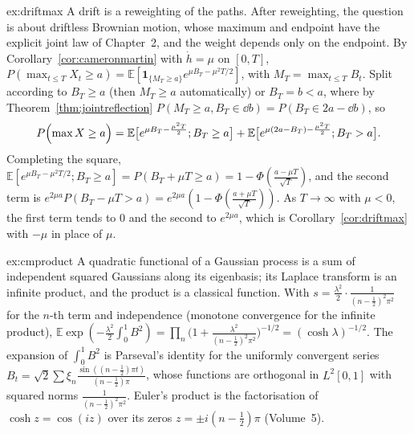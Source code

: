 \begin{solution}{ex:driftmax}
\idea A drift is a reweighting of the paths. After reweighting, the question is about driftless Brownian motion, whose maximum and endpoint have the explicit joint law of Chapter~2, and the weight depends
only on the endpoint.
\writeup By Corollary~\ref{cor:cameronmartin} with $\dot h=\mu$ on $[0,T]$, $P(\max_{t\le T}X_t\ge a)=\mathbb E[\mathbf 1_{\{M_T\ge a\}}e^{\mu B_T-\mu^2T/2}]$, with $M_T=\max_{t\le T}B_t$. Split according to $B_T\ge a$ (then $M_T\ge a$
automatically) or $B_T=b<a$, where by Theorem~\ref{thm:jointreflection} $P(M_T\ge a,B_T\in\dd b)=P(B_T\in2a-\dd b)$, so
\[
P\Bigl(\max X\ge a\Bigr)=\mathbb E\bigl[e^{\mu B_T-\frac{\mu^2T}2};B_T\ge a\bigr]+\mathbb E\bigl[e^{\mu(2a-B_T)-\frac{\mu^2T}2};B_T>a\bigr].
\]
Completing the square, $\mathbb E[e^{\mu B_T-\mu^2T/2};B_T\ge a]=P(B_T+\mu T\ge a)=1-\Phi(\frac{a-\mu T}{\sqrt T})$, and the second term is $e^{2\mu a}P(B_T-\mu T>a)=e^{2\mu a}(1-\Phi(\frac{a+\mu T}{\sqrt T}))$. As
$T\to\infty$ with $\mu<0$, the first term tends to $0$ and the second to $e^{2\mu a}$, which is Corollary~\ref{cor:driftmax} with $-\mu$ in place of $\mu$.
\end{solution}

\begin{solution}{ex:cmproduct}
\idea A quadratic functional of a Gaussian process is a sum of independent squared Gaussians along its eigenbasis; its Laplace transform is an infinite product, and the product is a classical function.
\writeup With $s=\frac{\lambda^2}2\cdot\frac1{(n-\frac12)^2\pi^2}$ for the $n$-th term and independence (monotone convergence for the infinite product),
$\mathbb E\exp(-\frac{\lambda^2}2\int_0^1B^2)=\prod_n\bigl(1+\frac{\lambda^2}{(n-\frac12)^2\pi^2}\bigr)^{-1/2}=(\cosh\lambda)^{-1/2}$. The expansion of $\int_0^1B^2$ is Parseval's identity for the uniformly convergent series
$B_t=\sqrt2\sum\xi_n\frac{\sin((n-\frac12)\pi t)}{(n-\frac12)\pi}$, whose functions are orthogonal in $L^2[0,1]$ with squared norms $\frac1{(n-\frac12)^2\pi^2}$. Euler's product is the factorisation of $\cosh z=\cos(iz)$ over
its zeros $z=\pm i(n-\frac12)\pi$ (Volume~5).
\end{solution}

